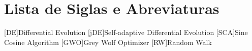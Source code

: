 \chapter*{Lista de Siglas e Abreviaturas}
\begin{acronym}

[DE]{Differential Evolution}
[jDE]{Self-adaptive Differential Evolution}
[SCA]{Sine Cosine Algorithm}
[GWO]{Grey Wolf Optimizer}
[RW]{Random Walk}

\end{acronym}
